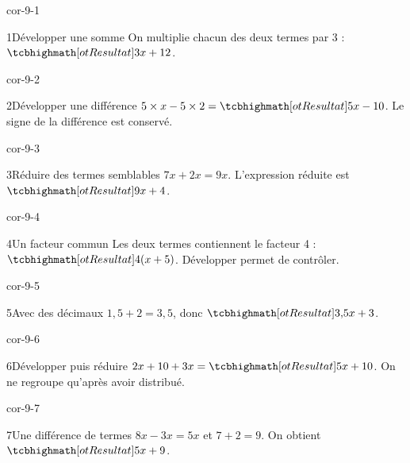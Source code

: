 \clearpage\pagestyle{otMain}\setlength{\otBlocEspacement}{2.5mm}\fontsize{11}{15}\selectfont{}
\begin{blocLivre}{cor-9-1}\begin{corrige}{1}{Développer une somme}
On multiplie chacun des deux termes par 3 : $\res{3x+12}$.
\end{corrige}\end{blocLivre}
\begin{blocLivre}{cor-9-2}\begin{corrige}{2}{Développer une différence}
$5\times x-5\times2=\res{5x-10}$. Le signe de la différence est conservé.
\end{corrige}\end{blocLivre}
\begin{blocLivre}{cor-9-3}\begin{corrige}{3}{Réduire des termes semblables}
$7x+2x=9x$. L’expression réduite est $\res{9x+4}$.
\end{corrige}\end{blocLivre}
\begin{blocLivre}{cor-9-4}\begin{corrige}{4}{Un facteur commun}
Les deux termes contiennent le facteur 4 : $\res{4(x+5)}$. Développer permet de contrôler.
\end{corrige}\end{blocLivre}
\begin{blocLivre}{cor-9-5}\begin{corrige}{5}{Avec des décimaux}
$1{,}5+2=3{,}5$, donc $\res{3{,}5x+3}$.
\end{corrige}\end{blocLivre}
\begin{blocLivre}{cor-9-6}\begin{corrige}{6}{Développer puis réduire}
$2x+10+3x=\res{5x+10}$. On ne regroupe qu’après avoir distribué.
\end{corrige}\end{blocLivre}
\begin{blocLivre}{cor-9-7}\begin{corrige}{7}{Une différence de termes}
$8x-3x=5x$ et $7+2=9$. On obtient $\res{5x+9}$.
\end{corrige}\end{blocLivre}
